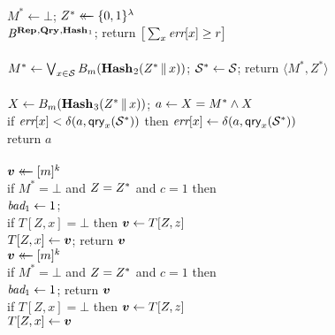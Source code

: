 \begin{figure*}
{
  \vspace{-7pt}
      \hfill {}\\[2pt]
    $M^* \gets \bot$;
    $Z^* \mathrel{\leftarrow\mkern-14mu\leftarrow} \{0,1\}^\lambda$\\
    $\mathit{B}^{\textup{\textbf{Rep}}\hspace{0.5pt},\textup{\textbf{Qry}}\hspace{0.5pt},\textup{\textbf{Hash}}\hspace{0.5pt}_1}$;
    return $\big[\sum_x \textit{err}[x] \geq r\big]$
  \\[6pt]
  \oraclev{$\REPO(\col)$}\\[2pt]
    $M^* \gets \bigvee_{x \in \mathcal{S}} {B}_m(\textup{\textbf{Hash}}\hspace{0.5pt}_2(Z^* \, \| \, x))$;
    $\mathcal{S}^* \gets \mathcal{S}$;
    return $\langle M^*, Z^* \rangle$
  \\[6pt]
  \\[2pt]
    $X \gets {B}_m(\textup{\textbf{Hash}}\hspace{0.5pt}_3(Z^* \, \| \, x))$;
    $a \gets X = M^* \wedge X$\\
    if $\textit{err}[x] < \delta(a,\mathsf{qry}_x(\mathcal{S}^*))$ then
          $\textit{err}[x] \gets \delta(a,\mathsf{qry}_x(\mathcal{S}^*))$\\
    return $a$
  \\[6pt]
  \\[2pt]
    $\boldsymbol{v} \mathrel{\leftarrow\mkern-14mu\leftarrow} [m]^k$\\
    if $M^*=\bot$ and $Z=Z^*$ and $c=1$ then \\
    \tab $\textit{bad}_1 \gets 1$; \\
    if $T[Z,x] = \bot$ then $\boldsymbol{v} \gets T[Z,z]$\\
    $T[Z,x] \gets \boldsymbol{v}$; return $\boldsymbol{v}$
}
{
  \vspace{-2pt}
  \\[2pt]
    $\boldsymbol{v} \mathrel{\leftarrow\mkern-14mu\leftarrow} [m]^k$\\
    if $M^*=\bot$ and $Z=Z^*$ and $c=1$ then\\
    \tab $\textit{bad}_1 \gets 1$; return $\boldsymbol{v}$\\
    if $T[Z,x] = \bot$ then $\boldsymbol{v} \gets T[Z,z]$\\
    $T[Z,x] \gets \boldsymbol{v}$\\[2pt]
    }
\end{figure*}
